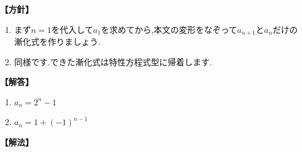     \noindent\textbf{【方針】}
    \begin{enumerate}[label=(\arabic*),parsep=3pt]
      \item まず$n=1$を代入して$a_1$を求めてから,本文の変形をなぞって$a_{n+1}$と$a_n$だけの漸化式を作りましょう.
      \item 同様です.できた漸化式は特性方程式型に帰着します.
    \end{enumerate}

    \noindent\textbf{【解答】}
    \begin{enumerate}[label=(\arabic*),parsep=3pt]
      \item $\displaystyle a_n=2^n-1$
      \item $\displaystyle a_n=1+(-1)^{n-1}$
    \end{enumerate}

    \noindent\textbf{【解法】}
